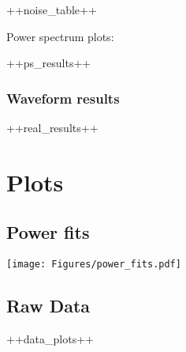 ++noise_table++

\vspace*{1cm}

Power spectrum plots:

++ps_results++


\subsubsection{Waveform results}

++real_results++

\section{Plots}

\subsection*{Power fits}
\texttt{[image: Figures/power\_fits.pdf]}   

\subsection*{Raw Data}
++data_plots++